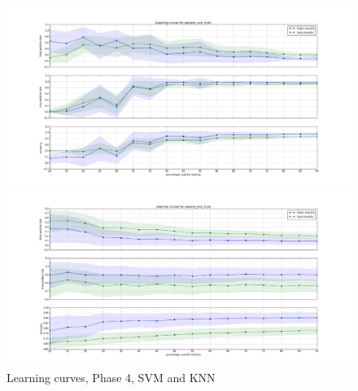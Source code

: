 \documentclass[10pt, conference, compsocconf]{IEEEtran}
\begin{document}
\begin{figure}[h]
\vskip 0.2in
\begin{center}
\centerline{\includegraphics[width=\columnwidth, scale=1]{./Figures/Lc_Ds4_P60-40_SVM}}
\centerline{\includegraphics[width=\columnwidth, scale=1]{./Figures/Lc_Ds4_P60-40_kNN}}
\caption{Learning curves, Phase 4, SVM and KNN}
\label{learning curves}
\end{center}
\vskip -0.2in
\end{figure} 
\end{document}
